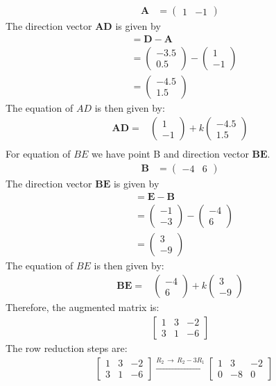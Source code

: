 \documentclass[journal,12pt,twocolumn]{IEEEtran}
\theoremstyle{remark}
\newcommand{\myvec}[1]{\begin{pmatrix}#1\end{pmatrix}}
\let\vec\mathbf
\begin{document}
\begin{align*}
    \vec{A} &= \myvec{1 & -1}    
\end{align*}
The direction vector $\vec{AD}$ is given by
\begin{align*}
&= \vec{D} - \vec{A} \\
&= \myvec{-3.5 \\ 0.5} - \myvec{1 \\ -1} \\
&= \myvec{-4.5 \\ 1.5}
\end{align*}
The equation of $AD$ is then given by:
\begin{align*}
\text{} \vec{AD} = &\myvec{1\\-1} + k \myvec{-4.5\\1.5}\\
\end{align*}
For equation of $BE$ we have point B and direction vector $\vec{BE}$.\begin{align*}
    \vec{B} &= \myvec{-4 & 6}    
\end{align*}
The direction vector $\vec{BE}$ is given by
\begin{align*}
&= \vec{E} - \vec{B} \\
&= \myvec{-1 \\ -3} - \myvec{-4 \\ 6} \\
&= \myvec{3 \\ -9}
\end{align*}The equation of $BE$ is then given by:
\begin{align*}
\text{} \vec{BE} = &\myvec{-4\\6} + k \myvec{3\\-9}
\end{align*}
Therefore, the augmented matrix is:
\begin{align*}
\begin{bmatrix}
1 & 3 & -2 \\
3 & 1 & -6
\end{bmatrix}
\end{align*}
The row reduction steps are:\\ 
\begin{align*}
&\begin{bmatrix}
1 & 3 & -2 \\
3 & 1 & -6
\end{bmatrix}
\xrightarrow{R_{2}\,\xrightarrow{}\,R_{2}-3R_{1}}
\begin{bmatrix}
1 & 3 & -2 \\
0 & -8 & 0
\end{bmatrix}
\end{align*}
\end{document}
